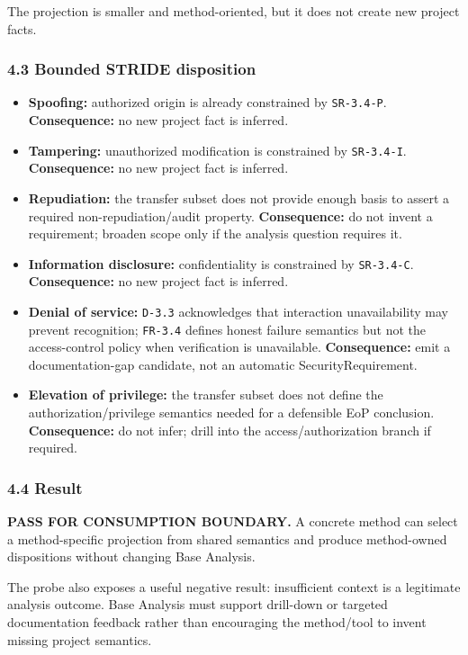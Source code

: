 \documentclass[
  10pt,
  a4paper,
]{article}
\providecommand{\tightlist}{%
  \setlength{\itemsep}{0pt}\setlength{\parskip}{0pt}}
\begin{document}
The projection is smaller and method-oriented, but it does not create
new project facts.

\subsubsection{4.3 Bounded STRIDE
disposition}\label{43-bounded-stride-disposition}

\begin{itemize}
\tightlist
\item
  \textbf{Spoofing:} authorized origin is already constrained by
  \texttt{SR-3.4-P}. \textbf{Consequence:} no new project fact is
  inferred.
\item
  \textbf{Tampering:} unauthorized modification is constrained by
  \texttt{SR-3.4-I}. \textbf{Consequence:} no new project fact is
  inferred.
\item
  \textbf{Repudiation:} the transfer subset does not provide enough
  basis to assert a required non-repudiation/audit property.
  \textbf{Consequence:} do not invent a requirement; broaden scope only
  if the analysis question requires it.
\item
  \textbf{Information disclosure:} confidentiality is constrained by
  \texttt{SR-3.4-C}. \textbf{Consequence:} no new project fact is
  inferred.
\item
  \textbf{Denial of service:} \texttt{D-3.3} acknowledges that
  interaction unavailability may prevent recognition; \texttt{FR-3.4}
  defines honest failure semantics but not the access-control policy
  when verification is unavailable. \textbf{Consequence:} emit a
  documentation-gap candidate, not an automatic SecurityRequirement.
\item
  \textbf{Elevation of privilege:} the transfer subset does not define
  the authorization/privilege semantics needed for a defensible EoP
  conclusion. \textbf{Consequence:} do not infer; drill into the
  access/authorization branch if required.
\end{itemize}

\subsubsection{4.4 Result}\label{44-result}

\textbf{PASS FOR CONSUMPTION BOUNDARY.} A concrete method can select a
method-specific projection from shared semantics and produce
method-owned dispositions without changing Base Analysis.

The probe also exposes a useful negative result: insufficient context is
a legitimate analysis outcome. Base Analysis must support drill-down or
targeted documentation feedback rather than encouraging the method/tool
to invent missing project semantics.
\end{document}
